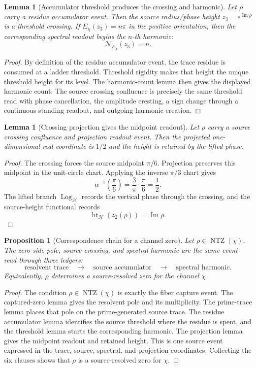 \documentclass[11pt]{article}
\newtheorem{lemma}[definition]{Lemma}
\newtheorem{proposition}[definition]{Proposition}
\DeclareMathOperator{\Imm}{Im}
\DeclareMathOperator{\NTZ}{NTZ}
\DeclareMathOperator{\Log}{Log}
\DeclareMathOperator{\hgt}{ht}
\begin{document}
\begin{lemma}[Accumulator threshold produces the crossing and harmonic]
Let $\rho$ carry a residue accumulator event.  Then the source radius/phase
height $z_3=e^{\Imm\rho}$ is a threshold crossing.  If $E_\chi(z_3)=n\pi$ in
the positive orientation, then the corresponding spectral readout begins the $n$-th
harmonic:
\[
  \mathcal N_{E_\chi}(z_3)=n.
\]
\end{lemma}

\begin{proof}
By definition of the residue accumulator event, the trace residue is consumed
at a ladder threshold.  Threshold rigidity makes that height the unique
threshold height for its level.  The harmonic-count lemma then gives the
displayed harmonic count.  The source crossing confluence is precisely the
same threshold read with phase cancellation, the amplitude cresting, a sign
change through a continuous standing readout, and outgoing
harmonic creation.
\end{proof}

\begin{lemma}[Crossing projection gives the midpoint readout]
Let $\rho$ carry a source crossing confluence and projection readout event.
Then the projected one-dimensional real coordinate is $1/2$ and the height is
retained by the lifted phase.
\end{lemma}

\begin{proof}
The crossing forces the source midpoint $\pi/6$.  Projection preserves this
midpoint in the unit-circle chart.  Applying the inverse $\pi/3$ chart gives
\[
  \alpha^{-1}\!\left(\frac{\pi}{6}\right)
  =
  \frac3\pi\cdot\frac{\pi}{6}
  =
  \frac12 .
\]
The lifted branch $\Log_{\mathcal H}$ records the vertical phase through the
crossing, and the source-height functional records
\[
  \hgt_{\mathcal H}(z_2(\rho))=\Imm\rho .
\]
\end{proof}

\begin{proposition}[Correspondence chain for a channel zero]
Let $\rho\in\NTZ(\chi)$.  The zero-side pole, source crossing, and spectral
harmonic are the same event read through three ledgers:
\[
  \text{resolvent trace}
  \quad\longrightarrow\quad
  \text{source accumulator}
  \quad\longrightarrow\quad
  \text{spectral harmonic}.
\]
Equivalently, $\rho$ determines a source-resolved zero for the channel $\chi$.
\end{proposition}

\begin{proof}
The condition $\rho\in\NTZ(\chi)$ is exactly the fiber capture event.  The
captured-zero lemma gives the resolvent pole and its multiplicity.  The
prime-trace lemma places that pole on the prime-generated source trace.  The
residue accumulator lemma identifies the source threshold where the residue is
spent, and the threshold lemma starts the corresponding harmonic.  The
projection lemma gives the midpoint readout and retained height.  This is one
source event expressed in the trace, source, spectral, and projection
coordinates.  Collecting the six clauses shows that $\rho$ is a source-resolved
zero for $\chi$.
\end{proof}
\end{document}
